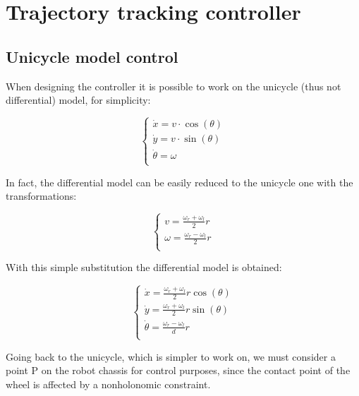 \documentclass[11pt,a4paper]{article}
\begin{document}

\section{Trajectory tracking controller}



\subsection{Unicycle model control}

When designing the controller it is possible to work on the unicycle (thus not differential) model, for simplicity:

$$
\begin{cases}
    \dot{x} = v \cdot \cos(\theta) \\
    \dot{y} = v \cdot \sin(\theta) \\
    \dot{\theta} = \omega \\
\end{cases}
$$

In fact, the differential model can be easily reduced to the unicycle one with the transformations:

$$
\begin{cases}
    v = {\frac {\omega_r + \omega_l}{2} r} \\
    \omega = {\frac {\omega_r - \omega_l}{2} r} \\
\end{cases}
$$

With this simple substitution the differential model is obtained:

$$
\begin{cases}
    \dot{x} = \frac{\omega_r + \omega_l}{2} r \cos(\theta) \\
    \dot{y} = \frac{\omega_r + \omega_l}{2} r \sin(\theta) \\
    \dot{\theta} = \frac{\omega_r - \omega_l}{d} r \\
\end{cases}
$$

Going back to the unicycle, which is simpler to work on, we must consider a point P on the robot chassis for
control purposes, since the contact point of the wheel is affected by a nonholonomic constraint.\\
\end{document}
